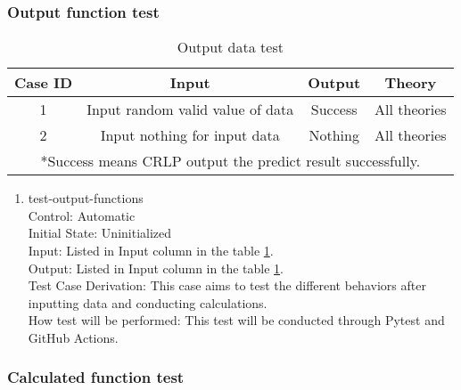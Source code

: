 \documentclass[12pt, titlepage]{article}
\begin{document}
\newpage
\subsubsection{Output function test}

\begin{table}
    \centering
    \begin{adjustbox}{width=\textwidth}
    \begin{tabularx}{\textwidth}{c|c|c|c} %
    \hline
        Case ID & Input & Output & Theory\\
    \hline
        1 & Input random valid value of data & Success & All theories\\
    \hline
        2& Input nothing for input data & Nothing & All theories\\
    \hline
    \multicolumn{4}{p{\dimexpr\textwidth-2\tabcolsep\relax}}{*Success means CRLP output the predict result successfully.} \\ 
    \end{tabularx}
    \end{adjustbox}
    \caption{Output data test}
    \label{tab:outputtest}
\end{table}

\begin{enumerate}

    \item test-output-functions \\
    Control: Automatic	\\				
    Initial State: Uninitialized\\		
    Input: Listed in Input column in the table \ref{tab:outputtest}.\\			
    Output: Listed in Input column in the table \ref{tab:outputtest}.\\
    Test Case Derivation: This case aims to test the different behaviors after inputting data and conducting calculations.\\
    How test will be performed: This test will be conducted through Pytest and GitHub Actions.\\
					
\end{enumerate}

\subsubsection{Calculated function test}
\end{document}
